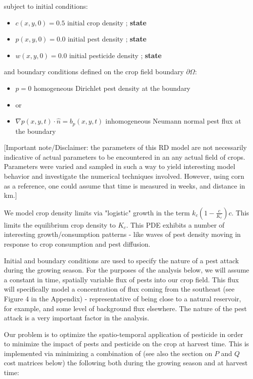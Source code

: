 \documentclass[11pt]{article}
\begin{document}
subject to initial conditions:

\begin{itemize}
\setlength\itemsep{-1pt}
\item $c(x,y,0) = 0.5$ initial crop density ; \textbf{state}
\item $p(x,y,0) = 0.0$ initial pest density ; \textbf{state}
\item $w(x,y,0) = 0.0$ initial pesticide density ; \textbf{state}
\end{itemize}

and boundary conditions defined on the crop field boundary $\partial\Omega$:

\begin{itemize}
\setlength\itemsep{-1pt}
\item $p = 0$ homogeneous Dirichlet pest density at the boundary
\item or
\item $\nabla p(x,y,t) \cdot \hat{n} = b_p(x,y,t)$ inhomogeneous Neumann normal pest flux at the boundary
\end{itemize}

[Important note/Disclaimer: the parameters of this RD model are not necessarily indicative of actual parameters to be encountered in an any actual field of crops. Parameters were varied and sampled in such a way to yield interesting model behavior and investigate the numerical techniques involved. However, using corn as a reference, one could assume that time is measured in weeks, and distance in km.]

We model crop density limits via "logistic" growth in the term $k_c \left( 1 - \frac{c}{K_c} \right) c$. This limits the equilibrium crop density to $K_c$. This PDE exhibits a number of interesting growth/consumption patterns - like waves of pest density moving in response to crop consumption and pest diffusion.

Initial and boundary conditions are used to specify the nature of a pest attack during the growing season. For the purposes of the analysis below, we will assume a constant in time, spatially variable flux of pests into our crop field. This flux will specifically model a concentration of flux coming from the southeast (see Figure 4 in the Appendix) - representative of being close to a natural reservoir, for example, and some level of background flux elsewhere. The nature of the pest attack is a very important factor in the analysis.

Our problem is to optimize the spatio-temporal application of pesticide in order to minimize the impact of pests and pesticide on the crop at harvest time. This is implemented via minimizing a combination of (see also the section on $P$ and $Q$ cost matrices below) the following both during the growing season and at harvest time:
\end{document}
